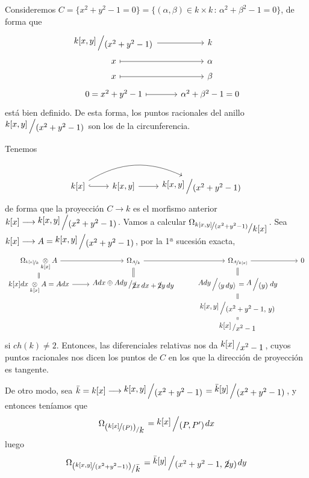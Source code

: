 \begin{ejem}
    Consideremos $C = \{x^2+y^2-1=0\} = \{(\alpha, \beta) \in k\times k\, : \, \alpha^2+\beta^2-1=0\}$, de forma que
    $$\bt \modulo{k[x,y]}{(x^2+y^2-1)} \rar & k \\[-5mm] x \rarmaps & \alpha \\[-5mm] x \rarmaps & \beta \\[-5mm] 0 =x^2+y^2-1 \rarmaps & \alpha^2+\beta^2-1=0 \et$$
    est\'a bien definido. De esta forma, los puntos racionales del anillo $ \modulo{k[x,y]}{(x^2+y^2-1)}$ son los de la circunferencia. 

    Tenemos 
    $$\bt k[x] \arrow[bend left=10mm]{rr} \rar[hook] & k[x,y] \rar &  \modulo{k[x,y]}{(x^2+y^2-1)} \et$$
    de forma que la proyecci\'on $C \longrightarrow k$ es el morfismo anterior $k[x] \longrightarrow  \modulo{k[x,y]}{(x^2+y^2-1)}$. Vamos a calcular $\Omega_{\modulo{\nicefrac{k[x,y]}{(x^2+y^2-1)}}{k[x]}}$. Sea $k[x] \longrightarrow A=  \modulo{k[x,y]}{(x^2+y^2-1)}$, por la 1ª sucesi\'on exacta, 
    $$\bt \Omega_{\nicefrac{k[x]}{k}} \underset{k[x]}{\otimes} A \rar & \Omega_{\nicefrac{A}{k}} \rar & \Omega_{\nicefrac{A}{k[x]}} \rar & 0 \\[-5mm] 
    \arrow[equal]{u} k[x]dx \underset{k[x]}{\otimes} A = Adx \rar  & \arrow[equal]{u} \modulo{Adx\oplus Ady}{\cancel{2}x \, dx + \cancel{2}y\, dy} & \arrow[equal]{u} \modulo{Ady}{\langle y \, dy \rangle} = \modulo{A}{(y)} \, dy \\[-5mm] & & \arrow[equal]{u}  \modulo{k[x,y]}{(x^2+y^2-1, \, y)} \\[-5mm] & & \arrow[equal]{u} \modulo{k[x]}{x^2-1} \et$$
    si $ch(k)\neq 2$. Entonces, las diferenciales relativas nos da $\modulo{k[x]}{x^2-1}$, cuyos puntos racionales nos dicen los puntos de $C$ en los que la direcci\'on de proyecci\'on es tangente. 

    De otro modo, sea $\bar k = k[x] \longrightarrow  \modulo{k[x,y]}{(x^2+y^2-1)} = \modulo{\bar k[y]}{(x^2+y^2-1)}$, y entonces ten\'iamos que
    $$\Omega_{\modulo{(\nicefrac{k[x]}{(P)})}{k}} = \modulo{k[x]}{(P,P')} dx$$
    luego 
    $$\Omega_{\modulo{( \nicefrac{k[x,y]}{(x^2+y^2-1)})}{\bar k}} = \modulo{\bar k[y]}{(x^2+y^2-1,\, \cancel{2}y)} dy$$
\end{ejem}
